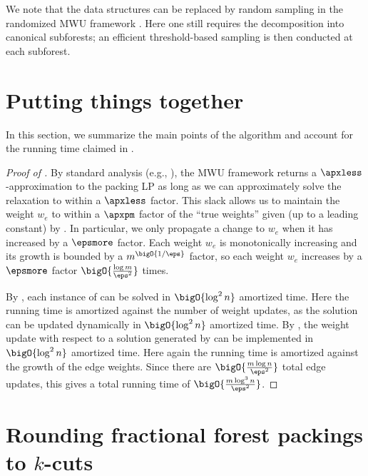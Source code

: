 \documentclass{toc}
\newcommand{\weight}[1]{w_{#1}}
\newcommand{\wrt}{with respect to\xspace} %
\begin{document}
We note that the  data structures can be replaced
by random sampling in the randomized MWU framework
\cite{cq-18-soda}. Here one still requires the decomposition into
canonical subforests; an efficient threshold-based sampling is then
conducted at each subforest.

\section{Putting things together}
 In this section, we summarize the main points
of the algorithm and account for the running time claimed in
.

%
%
%
%
\begin{proof}[Proof of ]
  By standard analysis (e.g., \cite[Theorem 2.1]{cq-17-soda}), the MWU
  framework returns a $\apxless$-approximation %
  to the packing LP  as long as we can
%
approximately solve %
the relaxation  to within a
  $\apxless$ factor. %
This slack allows us to maintain
  the weight $\weight{e}$ to within a $\apxpm$ factor %
  of the ``true weights'' given (up to a leading constant) by
  .  In particular, we only propagate a
  change to $\weight{e}$ when it has increased by a
  $\epsmore$ factor.  %
Each weight $\weight{e}$ is
  monotonically increasing and its growth is bounded by a
  $m^{\bigO{1/\eps}}$ factor,   %
so each weight
  $\weight{e}$ increases by a $\epsmore$ factor  %
  $\bigO{\frac{\log m}{\eps^2}}$ times.


  By , each instance of
   can be solved in $\bigO{\log^2 n}$
  amortized time. Here the running time is amortized against the
  number of weight updates, as the solution can be updated dynamically
  in $\bigO{\log^2 n}$ amortized time. By
  , the weight update \wrt a solution
  generated by  can be implemented in
  $\bigO{\log^2 n}$ amortized time. Here again the running time is
  amortized against the growth of the edge weights. Since there are
  $\bigO{\frac{m \log n}{\eps^2}}$ total edge updates, this gives a
  total running time of $\bigO{\frac{m \log^3 n}{\eps^2}}$.
\end{proof}

\section{Rounding fractional forest packings to $k$-cuts}
\end{document}
